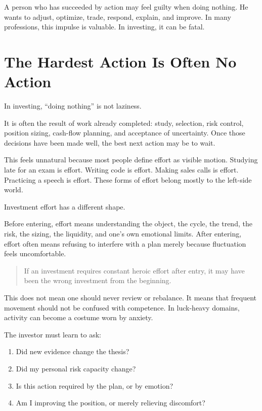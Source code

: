 A person who has succeeded by action may feel guilty when doing nothing. He wants to adjust, optimize, trade, respond, explain, and improve. In many professions, this impulse is valuable. In investing, it can be fatal.

\section*{The Hardest Action Is Often No Action}

In investing, ``doing nothing'' is not laziness.

It is often the result of work already completed: study, selection, risk control, position sizing, cash-flow planning, and acceptance of uncertainty. Once those decisions have been made well, the best next action may be to wait.

This feels unnatural because most people define effort as visible motion. Studying late for an exam is effort. Writing code is effort. Making sales calls is effort. Practicing a speech is effort. These forms of effort belong mostly to the left-side world.

Investment effort has a different shape.

Before entering, effort means understanding the object, the cycle, the trend, the risk, the sizing, the liquidity, and one's own emotional limits. After entering, effort often means refusing to interfere with a plan merely because fluctuation feels uncomfortable.

\begin{quote}
If an investment requires constant heroic effort after entry, it may have been the wrong investment from the beginning.
\end{quote}

This does not mean one should never review or rebalance. It means that frequent movement should not be confused with competence. In luck-heavy domains, activity can become a costume worn by anxiety.

The investor must learn to ask:

\begin{enumerate}
\item Did new evidence change the thesis?
\item Did my personal risk capacity change?
\item Is this action required by the plan, or by emotion?
\item Am I improving the position, or merely relieving discomfort?
\end{enumerate}

